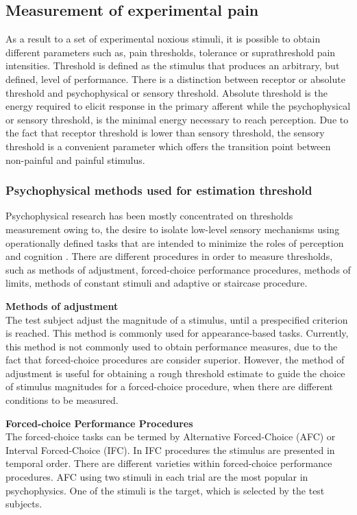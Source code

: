 \subsection{Measurement of experimental pain} 
As a result to a set of experimental noxious stimuli, it is possible to obtain different parameters such as, pain thresholds, tolerance or suprathreshold pain intensities. Threshold is defined as the stimulus that produces an arbitrary, but defined, level of performance. There is a distinction between receptor or absolute threshold and psychophysical or sensory threshold. Absolute threshold is the energy required to elicit response in the primary afferent while the psychophysical or sensory threshold, is the minimal energy necessary to reach perception. Due to the fact that receptor threshold is lower than sensory threshold, the sensory threshold is a convenient parameter which offers the transition point between non-painful and painful stimulus. \cite{Yarnitsky2006}

\subsubsection{Psychophysical methods used for estimation threshold}
Psychophysical research has been mostly concentrated on thresholds measurement owing to, the desire to isolate low-level sensory mechanisms using operationally defined tasks that are intended to minimize the roles of perception and cognition \cite{Pelli2010}. There are different procedures in order to measure thresholds, such as methods of adjustment, forced-choice performance procedures, methods of limits, methods of constant stimuli and adaptive or staircase procedure.


\textbf{Methods of adjustment}
\\
The test subject adjust the magnitude of a stimulus, until a prespecified criterion is reached. This method is commonly used for appearance-based tasks. Currently, this method is not commonly used to obtain performance measures, due to the fact that forced-choice procedures are consider superior. However, the method of adjustment is useful for obtaining a rough threshold estimate to guide the choice of stimulus magnitudes for a forced-choice procedure, when there are different conditions to be measured.

\textbf{Forced-choice Performance Procedures}
\\
The forced-choice tasks can be termed by Alternative Forced-Choice (AFC) or Interval Forced-Choice (IFC). In IFC procedures the stimulus are presented in temporal order. There are different varieties within forced-choice performance procedures. AFC using two stimuli in each trial are the most popular in psychophysics. One of the stimuli is the target, which is selected by the test subjects.


